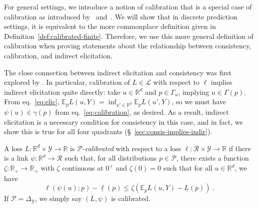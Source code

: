 \documentclass[anon,12pt]{colt2021} %
\newcommand{\Comments}{1}
\newcommand{\mytodo}[2]{\ifnum\Comments=1%
	\todo[linecolor=#1!80!black,backgroundcolor=#1,bordercolor=#1!80!black]{#2}\fi}
\newcommand{\jessiet}[1]{\mytodo{purple!20!white}{JF: #1}}
\newcommand{\reals}{\mathbb{R}}
\newcommand{\simplex}{\Delta_\Y}
\newcommand{\E}{\mathbb{E}}
\renewcommand{\L}{\mathcal{L}}
\newcommand{\R}{\mathcal{R}}
\renewcommand{\P}{\mathcal{P}}
\newcommand{\Y}{\mathcal{Y}}
\newcommand{\exploss}[3]{\E_{#3} #1(#2,Y)}
\newcommand{\risk}[1]{\underline{#1}}
\begin{document}
For general settings, we introduce a notion of calibration that is a special case of calibration as introduced by~\citet[Definition 2.7]{steinwart2007compare} and~\citet[Chapter 3]{steinwart2008support}. 
We will show that in discrete prediction settings, it is equivalent to the more commonplace definition given in Definition~\ref{def:calibrated-finite}.
Therefore, we use this more general definition of calibration when proving statements about the relationship between consistency, calibration, and indirect elicitation.

The close connection between indirect elicitation and consistency was first explored by \citet{agarwal2015consistent}.
In particular, calibration of $L \in \L$ with respect to $\ell$ implies indirect elicitation quite directly: take $u\in\reals^d$ and $p\in\Gamma_u$, implying $u\in\Gamma(p)$.
From eq.~\eqref{eq:elic}, $\exploss{L}{u}{p} = \inf_{u'\in\reals^d} \exploss{L}{u'}{p}$, so we must have $\psi(u) \in \gamma(p)$ from eq.~\eqref{eq:calibration}, as desired.
As a result, indirect elicitation is a necessary condition for consistency in this case, and in fact, we show this is true for all four quadrants (\S~\ref{sec:consis-implies-indir}).

\begin{definition}\label{def:calibrated-general}
	A loss $L:\reals^d \times \Y \to \reals$ is \emph{$\P$-calibrated} with respect to a loss $\ell : \R \times \Y \to \reals$ if there is a link $\psi : \reals^d \to \R$ such that, for all distributions $p \in \P$, there exists a function $\zeta : \reals_+ \to \reals_+$ with $\zeta$ continuous at $0^+$ and $\zeta(0) = 0$ such that for all $u \in \reals^d$, we have
	\begin{equation}\label{eq:calibrated-general}
	\ell( \psi(u); p) - \risk{\ell}(p)  \leq \zeta \left(  \exploss{L}{u}{p} - \risk{L}(p) \right)~.~
	\end{equation}
	If $\P = \simplex$, we simply say $(L, \psi)$ is calibrated.
\end{definition}
\end{document}
